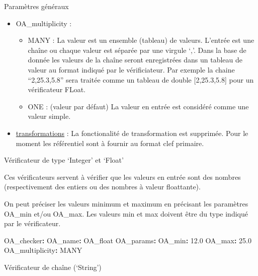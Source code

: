 \documentclass[
  letterpaper,
  DIV=11,
  numbers=noendperiod]{scrartcl}
\newenvironment{Shaded}{\begin{snugshade}}{\end{snugshade}}
\newcommand{\AttributeTok}[1]{\textcolor[rgb]{0.40,0.45,0.13}{#1}}
\newcommand{\FloatTok}[1]{\textcolor[rgb]{0.68,0.00,0.00}{#1}}
\newcommand{\FunctionTok}[1]{\textcolor[rgb]{0.28,0.35,0.67}{#1}}
\newcommand{\KeywordTok}[1]{\textcolor[rgb]{0.00,0.23,0.31}{\textbf{#1}}}
\providecommand{\tightlist}{%
  \setlength{\itemsep}{0pt}\setlength{\parskip}{0pt}}\usepackage{longtable,booktabs,array}
\begin{document}
Paramètres généraux

\begin{itemize}
\tightlist
\item
  OA\_multiplicity :

  \begin{itemize}
  \tightlist
  \item
    MANY : La valeur est un ensemble (tableau) de valeurs. L'entrée est
    une chaîne ou chaque valeur est séparée par une virgule `,'. Dans la
    base de donnée les valeurs de la chaîne seront enregistrées dans un
    tableau de valeur au format indiqué par le vérificiateur. Par
    exemple la chaine ``2,25.3,5.8'' sera traitée comme un tableau de
    double {[}2,25.3,5.8{]} pour un vérificateur FLoat.
  \item
    ONE : (valeur par défaut) La valeur en entrée est considéré comme
    une valeur simple.
  \end{itemize}
\item
  \hyperref[transformations]{transformations} : La fonctionalité de
  transformation est supprimée. Pour le moment les référentiel sont à
  fournir au format clef primaire.
\end{itemize}

Vérificateur de type `Integer' et `Float'

Ces vérificateurs servent à vérifier que les valeurs en entrée sont des
nombres (respectivement des entiers ou des nombres à valeur floattante).

On peut préciser les valeurs minimum et maximum en précisant les
paramètres OA\_min et/ou OA\_max. Les valeurs min et max doivent être du
type indiqué par le vérificateur.

\begin{Shaded}
\begin{Highlighting}[]
\AttributeTok{    }\FunctionTok{OA\_checker}\KeywordTok{:}\AttributeTok{ }
\AttributeTok{      }\FunctionTok{OA\_name}\KeywordTok{:}\AttributeTok{ OA\_float}
\AttributeTok{      }\FunctionTok{OA\_params}\KeywordTok{:}\AttributeTok{ }
\AttributeTok{        }\FunctionTok{OA\_min}\KeywordTok{:}\AttributeTok{ }\FloatTok{12.0}
\AttributeTok{        }\FunctionTok{OA\_max}\KeywordTok{:}\AttributeTok{ }\FloatTok{25.0}
\AttributeTok{        }\FunctionTok{OA\_multiplicity}\KeywordTok{:}\AttributeTok{ MANY}
\end{Highlighting}
\end{Shaded}

Vérificateur de chaîne (`String')
\end{document}
